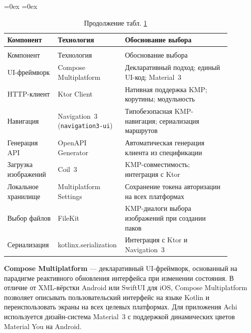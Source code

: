 \documentclass[../main.tex]{subfiles}
\begin{document}
\aboverulesep=0ex
\belowrulesep=0ex
\begin{small}
\begin{longtable}[t]{
	|>{\raggedright}p{0.22\linewidth} |
	>{\raggedright}p{0.22\linewidth} |
	>{\raggedright\arraybackslash}p{0.46\linewidth}|
}

\caption{Технологический стек приложения Achi} \label{tab:tech-stack}\\
\midrule
Компонент & Технология & Обоснование выбора \\
\midrule
\endfirsthead

\caption*{Продолжение табл. \ref{tab:tech-stack}\raggedleft}\\\midrule
Компонент & Технология & Обоснование выбора \\
\midrule
\endhead

\endfoot
\midrule
\endlastfoot

UI-фреймворк & Compose Multiplatform & Декларативный подход; единый UI-код; Material~3 \\
\midrule
HTTP-клиент & Ktor Client & Нативная поддержка KMP; корутины; модульность \\
\midrule
Навигация & Navigation~3 (\texttt{navigation3-ui}) & Типобезопасная KMP-навигация; сериализация маршрутов \\
\midrule
Генерация API & OpenAPI Generator & Автоматическая генерация клиента из спецификации \\
\midrule
Загрузка изображений & Coil~3 & KMP-совместимость; интеграция с Ktor \\
\midrule
Локальное хранилище & Multiplatform Settings & Сохранение токена авторизации на всех платформах \\
\midrule
Выбор файлов & FileKit & KMP-диалоги выбора изображений при создании паков \\
\midrule
Сериализация & kotlinx.serialization & Интеграция с Ktor и Navigation~3 \\

\end{longtable}
\end{small}

\textbf{Compose Multiplatform} --- декларативный UI-фреймворк, основанный на парадигме реактивного обновления интерфейса при изменении состояния. В отличие от XML-вёрстки Android или SwiftUI для iOS, Compose Multiplatform позволяет описывать пользовательский интерфейс на языке Kotlin и переиспользовать экраны на всех целевых платформах. Для приложения Achi используется дизайн-система Material~3 с поддержкой динамических цветов Material You на Android.
\end{document}
